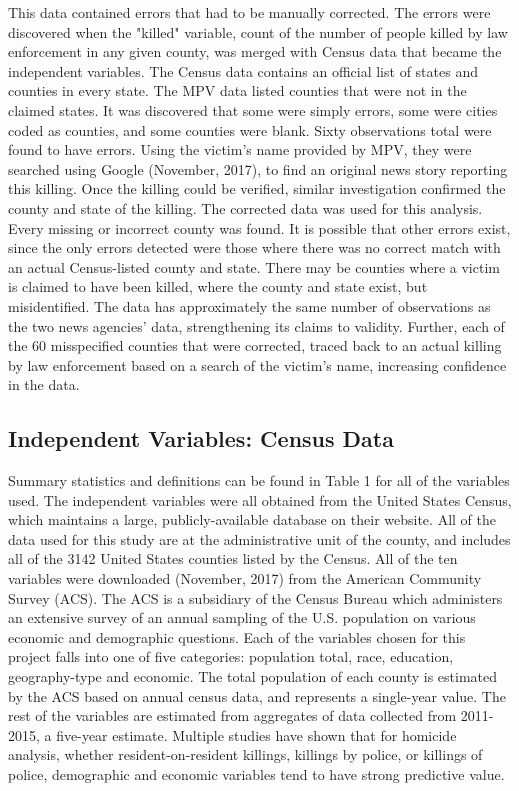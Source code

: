 \documentclass[sigconf]{acmart}
\begin{document}
This data contained errors that had to be manually corrected.  The errors were discovered when the "killed" variable, count of the number of people killed by law enforcement in any given county, was merged with Census data that became the independent variables.  The Census data contains an official list of states and counties in every state. The MPV data listed counties that were not in the claimed states.  It was discovered that some were simply errors, some were cities coded as counties, and some counties were blank.  Sixty observations total were found to have errors.  Using the victim's name provided by MPV, they were searched using Google (November, 2017), to find an original news story reporting this killing.  Once the killing could be verified, similar investigation confirmed the county and state of the killing.  The corrected data was used for this analysis.  Every missing or incorrect county was found.  It is possible that other errors exist, since the only errors detected were those where there was no correct match with an actual Census-listed county and state.  There may be counties where a victim is claimed to have been killed, where the county and state exist, but misidentified.  The data has approximately the same number of observations as the two news agencies' data, strengthening its claims to validity.  Further, each of the 60 misspecified counties that were corrected, traced back to an actual killing by law enforcement based on a search of the victim's name, increasing confidence in the data.

\subsection{Independent Variables: Census Data}
Summary statistics and definitions can be found in Table 1 for all of the variables used.  The independent variables were all obtained from the United States Census, which maintains a large, publicly-available database on their website. \cite{census}  All of the data used for this study are at the administrative unit of the county, and includes all of the 3142 United States counties listed by the Census.  All of the ten variables were downloaded (November, 2017) from the American Community Survey (ACS). The ACS is a subsidiary of the Census Bureau which administers an extensive survey of an annual sampling of the U.S. population on various economic and demographic questions.  Each of the variables chosen for this project falls into one of five categories: population total, race, education, geography-type and economic.  The total population of each county is estimated by the ACS based on annual census data, and represents a single-year value.  The rest of the variables are estimated from aggregates of data collected from 2011-2015, a five-year estimate.  Multiple studies have shown that for homicide analysis, whether resident-on-resident killings, killings by police, or killings of police, demographic and economic variables tend to have strong predictive value. \cite{pridemore05,kaminski05,legewie15,patterson16,smith14}
\end{document}
